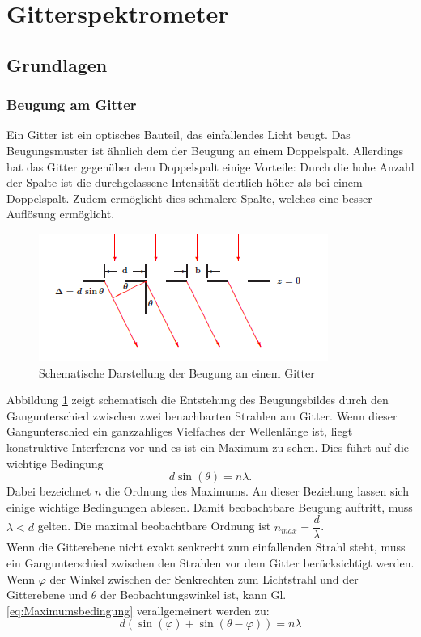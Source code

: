 \documentclass[12pt,a4paper]{article}
\begin{document}
\newpage
\section{Gitterspektrometer}

\subsection{Grundlagen}
\subsubsection{Beugung am Gitter}
Ein Gitter ist ein optisches Bauteil, das einfallendes Licht beugt. Das Beugungsmuster ist ähnlich dem der Beugung an einem Doppelspalt. Allerdings hat das Gitter gegenüber dem Doppelspalt einige Vorteile: Durch die hohe Anzahl der Spalte ist die durchgelassene Intensität deutlich höher als bei einem Doppelspalt. Zudem ermöglicht dies schmalere Spalte, welches eine besser Auflösung ermöglicht.\\
	\begin{figure}
		\begin{center}
			\includegraphics[scale=1.2]{Bilder/Gitterbeugung_Schema.PNG}
		\end{center}
		\caption[Gitterbeugung Schema]{Schematische Darstellung der Beugung an einem Gitter}
		\label{fig:Gitterbeugung_Schema}
	\end{figure}
	Abbildung \ref{fig:Gitterbeugung_Schema} zeigt schematisch die Entstehung des Beugungsbildes durch den Gangunterschied zwischen zwei benachbarten Strahlen am Gitter. Wenn dieser Gangunterschied ein ganzzahliges Vielfaches der Wellenlänge ist, liegt konstruktive Interferenz vor und es ist ein Maximum zu sehen. Dies führt auf die wichtige Bedingung
	\begin{equation}
	d \sin (\theta) = n \lambda.
	\label{eq:Maximumsbedingung}
	\end{equation}
	Dabei bezeichnet $n$ die Ordnung des Maximums. An dieser Beziehung lassen sich einige wichtige Bedingungen ablesen. Damit beobachtbare Beugung auftritt, muss $\lambda < d$ gelten. Die maximal beobachtbare Ordnung ist $n_{max} = \dfrac{d}{\lambda}$. \\
	Wenn die Gitterebene nicht exakt senkrecht zum einfallenden Strahl steht, muss ein Gangunterschied zwischen den Strahlen vor dem Gitter berücksichtigt werden. Wenn $\varphi$ der Winkel zwischen der Senkrechten zum Lichtstrahl und der Gitterebene und $\theta$ der Beobachtungswinkel ist, kann Gl. \ref{eq:Maximumsbedingung} verallgemeinert werden zu:
	\begin{equation}
	d(\sin(\varphi) + \sin(\theta - \varphi)) = n \lambda
	\label{eq:VerallgemeinerteMaximumsbedingung}
	\end{equation}
	
\end{document}

